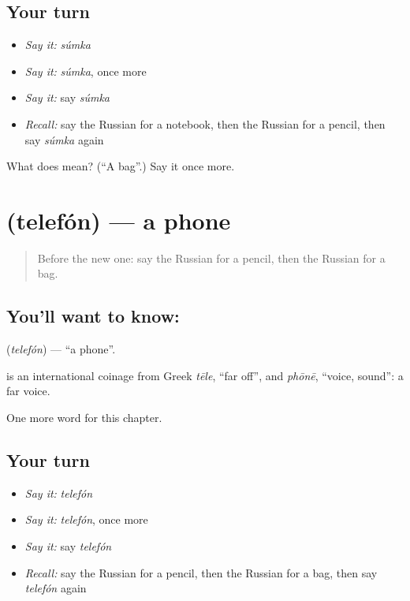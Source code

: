 \subsection*{Your turn}
\begin{itemize}
\raggedright
  \item \emph{Say it:} \emph{súmka}
  \item \emph{Say it:} \emph{súmka}, once more
  \item \emph{Say it:} say \emph{súmka}
  \item \emph{Recall:} say the Russian for a notebook, then the Russian for a pencil, then say \emph{súmka} again
\end{itemize}

\begin{tcolorbox}[breakable,colback=teal!4,colframe=teal!35!black,title={Before you move on}]
What does  mean? (\textquotedblleft{}A bag\textquotedblright{}.) Say it once more.
\end{tcolorbox}
\section[\texorpdfstring{\ru{телефон} (telefón)}{телефон (telefón)}]{ (telefón) — a phone}

\label{lesson:RU-C53-phone}



\begin{quote}
Before the new one: say the Russian for a pencil, then the Russian for a bag.
\end{quote}

\subsection*{You'll want to know: }
\textbf{} (\emph{telefón}) — \textquotedblleft{}a phone\textquotedblright{}.

\begin{cousinweb}
\textbf{} is an international coinage from Greek \emph{tēle}, \textquotedblleft{}far off\textquotedblright{}, and \emph{phōnē}, \textquotedblleft{}voice, sound\textquotedblright{}: a far voice.
\end{cousinweb}

\begin{grammarlens}[title={What you've built}]
One more word for this chapter.
\end{grammarlens}

\subsection*{Your turn}
\begin{itemize}
\raggedright
  \item \emph{Say it:} \emph{telefón}
  \item \emph{Say it:} \emph{telefón}, once more
  \item \emph{Say it:} say \emph{telefón}
  \item \emph{Recall:} say the Russian for a pencil, then the Russian for a bag, then say \emph{telefón} again
\end{itemize}

